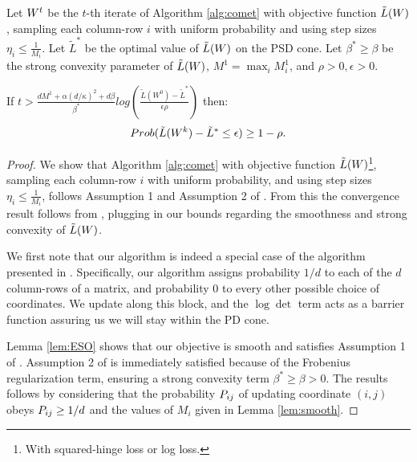 \documentclass{article}
\begin{document}
\begin{apptheorem}
Let ${W}^t$ be the $t$-th iterate of Algorithm \ref{alg:comet} with objective function $\tilde{L}({W})$, sampling each column-row $i$ with uniform probability and using step sizes $\eta_i \leq \frac{1}{M_i}$. Let $\tilde{L}^*$ be the optimal value of $\tilde{L}({W})$ on the PSD cone. Let $\beta^* \geq \beta$ be the strong convexity parameter of $\tilde{L}({W})$, $M^1 = \max_i M^1_i$, and $\rho >0, \epsilon>0$.

If $t > \frac{d M^1 + \alpha (d/\kappa)^2 + d\beta}{\beta^*} log \left( \frac{\tilde{L}(W^0) - \tilde{L}^*}{\epsilon \rho}\right)$ then: $$Prob(\tilde{L}({W}^k) - \tilde{L}^* \leq \epsilon) \geq 1-\rho.$$
\end{apptheorem}
\begin{proof}
We show that Algorithm \ref{alg:comet} with objective function $\tilde{L}({W})$\footnote{With squared-hinge loss or log loss.}, sampling each column-row $i$ with uniform probability, and using step sizes $\eta_i \leq \frac{1}{M_i}$, follows Assumption 1 and Assumption 2 of \citet{richtarik2013optimal}. From this the convergence result follows from \citet[Theorem 3]{richtarik2013optimal} , plugging in our bounds regarding the smoothness and strong convexity of $\tilde{L}({W})$.

We first note that our algorithm is indeed a special case of the algorithm presented in \citet{richtarik2013optimal}. Specifically, our algorithm assigns probability $1/d$ to each of the $d$ column-rows of a matrix, and probability $0$ to every other possible choice of coordinates. We update along this block, and the $\log \det$ term acts as a barrier function
assuring us we will stay within the PD cone.

Lemma \ref{lem:ESO} shows that our objective is smooth and satisfies Assumption 1 of \citet{richtarik2013optimal}. Assumption 2 of \citet{richtarik2013optimal} is immediately satisfied because of the Frobenius regularization term, ensuring a strong convexity term  $\beta^* \geq \beta > 0$. The results follows by considering that the probability ${P}_{ij}$ of updating coordinate $(i,j)$ obeys ${P}_{ij} \geq 1/d$ and the values of $M_i$ given in Lemma \ref{lem:smooth}.

\end{proof}



\end{document}
